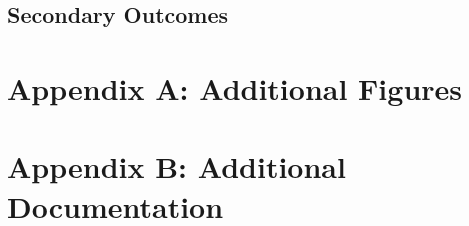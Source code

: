 \documentclass[
  11pt,
]{article}
\begin{document}
\hypertarget{secondary-outcomes}{%
\subsection{Secondary Outcomes}\label{secondary-outcomes}}

\clearpage

\hypertarget{appendix-a-additional-figures}{%
\section*{Appendix A: Additional Figures}\label{appendix-a-additional-figures}}

\clearpage

\hypertarget{appendix-b-additional-documentation}{%
\section*{Appendix B: Additional Documentation}\label{appendix-b-additional-documentation}}
\end{document}
